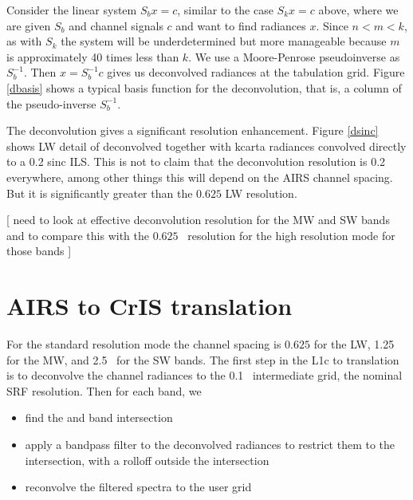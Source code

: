 \documentclass[12pt]{article}
\begin{document}
Consider the linear system $S_b x = c$, similar to the case 
$S_k x = c$ above, where we are given $S_b$ and channel signals $c$
and want to find radiances $x$.  Since $n < m < k$, as with $S_k$
the system will be underdetermined but more manageable because $m$
is approximately 40 times less than $k$.  We use a Moore-Penrose
pseudoinverse as $S_b^{-1}$.  Then $x = S_b^{-1} c$ gives us
deconvolved radiances at the {\srf} tabulation grid.  Figure
\ref{dbasis} shows a typical basis function for the {\airs}
deconvolution, that is, a column of the pseudo-inverse $S_b^{-1}$.

The {\airs} deconvolution gives a significant resolution enhancement.
Figure \ref{dsinc} shows LW detail of deconvolved {\airs} together
with kcarta radiances convolved directly to a 0.2 {\wn} sinc ILS.
This is not to claim that the deconvolution resolution is 0.2~{\wn}
everywhere, among other things this will depend on the AIRS channel
spacing.  But it is significantly greater than the {\cris} $0.625$
{\wn} LW resolution.  

[ need to look at effective deconvolution resolution for the MW and
  SW bands and to compare this with the $0.625$~{\wn} resolution for
  the {\cris} high resolution mode for those bands ]

\FloatBarrier
\section{AIRS to CrIS translation}
\label{airs2cris}

For the {\cris} standard resolution mode the channel spacing is
$0.625$ {\wn} for the LW, 1.25~{\wn} for the MW, and 2.5~{\wn} for
the SW bands.  The first step in the {\airs} L1c to {\cris}
translation is to deconvolve the {\airs} channel radiances to the
0.1~{\wn} intermediate grid, the nominal {\airs} SRF resolution.
Then for each {\cris} band, we

\begin{itemize}
  \item find the {\airs} and {\cris} band intersection

  \item apply a bandpass filter to the deconvolved {\airs} radiances
    to restrict them to the intersection, with a rolloff outside the
    intersection

  \item reconvolve the filtered spectra to the {\cris} user grid

\end{itemize}
\end{document}
